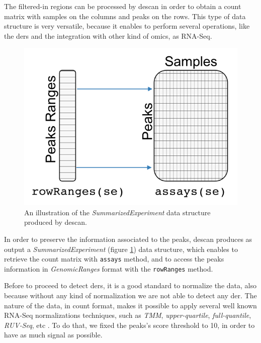 The filtered-in regions can be processed by \gls{descan} in order to obtain a count matrix with samples on the columns and peaks on the rows.
This type of data structure is very versatile, because it enables to perform several operations, like the \glspl{der} and the integration with other kind of omics, as RNA-Seq.

\begin{figure}[H]
\centering
\includegraphics[scale=.5]{img/descan2/counts.png}
\caption[\gls{descan} counts illustration]{An illustration of the \textit{SummarizedExperiment} data structure produced by \gls{descan}.}
\label{fig:countsdescan}
\centering
\end{figure}

In order to preserve the information associated to the peaks, \gls{descan} produces as output a \textit{SummarizedExperiment} (figure \ref{fig:countsdescan}) data structure, which enables to retrieve the count matrix with \lstinline!assays! method, and to access the peaks information in \textit{GenomicRanges} format with the \lstinline!rowRanges! method.

Before to proceed to detect \glspl{der}, it is a good standard to normalize the data, also because without any kind of normalization we are not able to detect any \gls{der}.
The nature of the data, in count format, makes it possible to apply several well known RNA-Seq normalizations techniques, such as \textit{TMM}, \textit{upper-quartile}, \textit{full-quantile}, \textit{RUV-Seq}, etc \cite{Risso2014h, Robinson2010, Dillies2013}.
To do that, we fixed the peaks's score threshold to 10, in order to have as much signal as possible.

